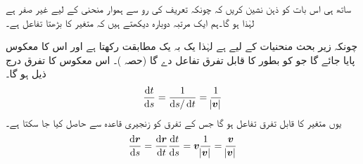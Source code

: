 ساتھ ہی اس بات کو ذہن نشین کریں کہ چونکہ تعریف کی رو سے ہموار منحنی کے لیے   غیر صفر   ہے لہٰذا  ہو گا۔ہم ایک مرتبہ دوبارہ دیکھتے ہیں کہ  متغیر  کا بڑھتا تفاعل ہے۔

چونکہ زیر بحث منحنیات کے لیے  ہے  لہٰذا  یک بہ یک مطابقت رکھتا ہے اور اس کا  معکوس  پایا جائے گا جو   کو بطور  کا قابل تفرق تفاعل دے گا (حصہ )۔ اس معکوس  کا تفرق درج ذیل ہو گا۔
\begin{align}\label{مساوات_سمتی_تفاعل_لمبائی_قوس_ث}
\frac{\dif t}{\dif s}=\frac{1}{\dif s/\dif t}=\frac{1}{\abs{\kvec{v}}}
\end{align}
یوں  متغیر  کا قابل تفرق تفاعل ہو گا جس کے تفرق کو زنجیری قاعدہ سے حاصل کیا جا سکتا ہے۔
\begin{align}\label{مساوات_سمتی_تفاعل_لمبائی_قوس_ج}
\frac{\dif \kvec{r}}{\dif s}=\frac{\dif \kvec{r}}{\dif t}\frac{\dif t}{\dif s}=\kvec{v}\frac{1}{\abs{\kvec{v}}}=\frac{\kvec{v}}{\abs{\kvec{v}}}
\end{align}

